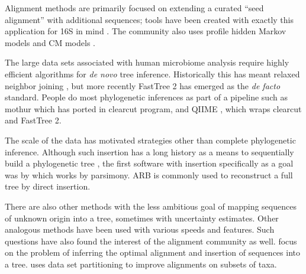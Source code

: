\documentclass{amsart}
\begin{document}
Alignment methods are primarily focused on extending a curated ``seed alignment'' with additional sequences; tools have been created with exactly this application for 16S in mind \citep{desantis2006nast,caporaso2010pynast,pruesse2012sina}.
The community also uses profile hidden Markov models \citep{eddy1998profile} and CM models \citep{nawrocki2009infernal,nawrocki2009structural}.

The large data sets associated with human microbiome analysis require highly efficient algorithms for \emph{de novo} tree inference.
Historically this has meant relaxed neighbor joining \cite{evans2006relaxed,sheneman2006clearcut}, but more recently FastTree 2 \citep{price2010fasttree} has emerged as the \textit{de facto} standard.
People do most phylogenetic inferences as part of a pipeline such as mothur \citep{schloss2009introducing} which has ported in clearcut \citep{evans2006relaxed,sheneman2006clearcut} program, and QIIME \citep{caporaso2010qiime}, which wraps clearcut and FastTree 2.

The scale of the data has motivated strategies other than complete phylogenetic inference.
Although such insertion has a long history as a means to sequentially build a phylogenetic tree \citep{kluge1969quantitative}, the first software with insertion specifically as a goal was by \citep{ludwig2004arb} which works by parsimony.
ARB is commonly used to reconstruct a full tree by direct insertion.

There are also other methods with the less ambitious goal of mapping sequences of unknown origin into a tree, sometimes with uncertainty estimates.
Other analogous methods have been used \citep{wu2008simple,monierEaLargeViruses08,vonMeringEaQuantitative08,stark2010mltreemap,matsen2010pplacer,berger2011performance} with various speeds and features.
Such questions have also found the interest of the alignment community as well.
\citet{berger2011aligning} focus on the problem of inferring the optimal alignment and insertion of sequences into a tree.
\citet{mirarabsepp} uses data set partitioning to improve alignments on subsets of taxa.
\end{document}
